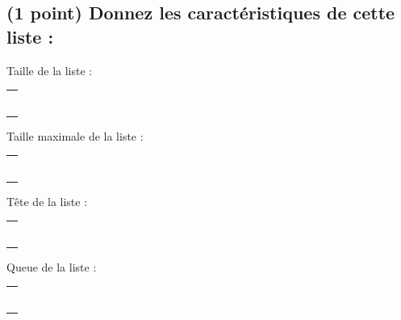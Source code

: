 \documentclass[11pt,a4paper]{article}
\begin{document}
\bigskip

\subsection{(1 point) Donnez les caractéristiques de cette liste : }

\bigskip

\begin{table}[h!]
  \centering
  \begin{minipage}{0.25\textwidth}
    \centering
Taille de la liste :

\medskip

\begin{tabular}{ | m{2.5cm} | }
\hline
 \\ \\ \\ \\ \\ \\
\hline
\end{tabular}

  \end{minipage}
  \hfillx
  \begin{minipage}{0.25\textwidth}
    \centering
Taille maximale de la liste :

\medskip

\begin{tabular}{ | m{2.5cm} | }
\hline
 \\ \\ \\ \\ \\ \\
\hline
\end{tabular}

  \end{minipage}
  \hfillx
  \begin{minipage}{0.25\textwidth}
    \centering
Tête de la liste :

\medskip

\begin{tabular}{ | m{2.5cm} | }
\hline
 \\ \\ \\ \\ \\ \\
\hline
\end{tabular}

  \end{minipage}
  \hfillx
  \begin{minipage}{0.25\textwidth}
    \centering
Queue de la liste :

\medskip

\begin{tabular}{ | m{2.5cm} | }
\hline
 \\ \\ \\ \\ \\ \\
\hline
\end{tabular}

  \end{minipage}
\end{table}
\end{document}
